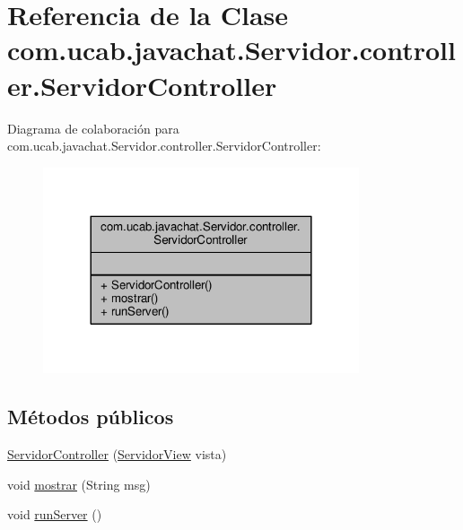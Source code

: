 \hypertarget{classcom_1_1ucab_1_1javachat_1_1_servidor_1_1controller_1_1_servidor_controller}{\section{Referencia de la Clase com.\-ucab.\-javachat.\-Servidor.\-controller.\-Servidor\-Controller}
\label{classcom_1_1ucab_1_1javachat_1_1_servidor_1_1controller_1_1_servidor_controller}
}


Diagrama de colaboración para com.\-ucab.\-javachat.\-Servidor.\-controller.\-Servidor\-Controller\-:
\nopagebreak
\begin{figure}[H]
\begin{center}
\leavevmode
\includegraphics[width=264pt]{df/d6b/classcom_1_1ucab_1_1javachat_1_1_servidor_1_1controller_1_1_servidor_controller__coll__graph}
\end{center}
\end{figure}
\subsection*{Métodos públicos}
\begin{DoxyCompactItemize}
\item 
\hyperlink{classcom_1_1ucab_1_1javachat_1_1_servidor_1_1controller_1_1_servidor_controller_a36f238b4a06304d92f09c51ca60c31e5}{Servidor\-Controller} (\hyperlink{classcom_1_1ucab_1_1javachat_1_1_servidor_1_1view_1_1_servidor_view}{Servidor\-View} vista)
\item 
void \hyperlink{classcom_1_1ucab_1_1javachat_1_1_servidor_1_1controller_1_1_servidor_controller_a73afbbd665ab0cdb6bfb58e1726ffe3c}{mostrar} (String msg)
\item 
void \hyperlink{classcom_1_1ucab_1_1javachat_1_1_servidor_1_1controller_1_1_servidor_controller_a363c2a7d307466fc9afd04fa3de32b68}{run\-Server} ()
\end{DoxyCompactItemize}



